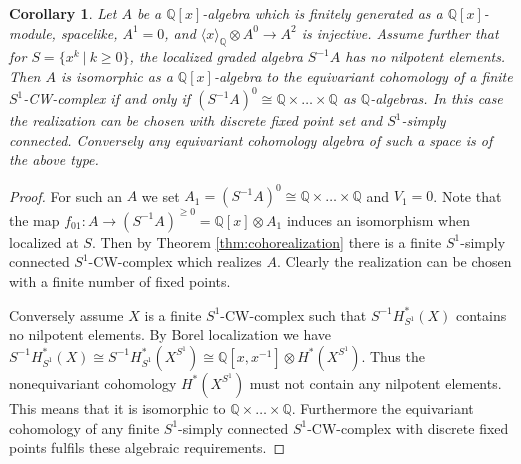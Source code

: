 \documentclass[12pt,a4paper]{article}
\newtheorem{cor}[thm]{Corollary}
\theoremstyle{definition}
\begin{document}
\begin{cor}\label{cor:discretealgebras}
Let $A$ be a $\mathbb{Q}[x]$-algebra which is finitely generated as a $\mathbb{Q}[x]$-module, spacelike, $A^1=0$, and $\langle x\rangle_\mathbb{Q}\otimes A^0\rightarrow A^2$ is injective. Assume further that for $S=\{x^k~|~k\geq 0\}$, the localized graded algebra $S^{-1}A$ has no nilpotent elements. Then $A$ is isomorphic as a $\mathbb{Q}[x]$-algebra to the equivariant cohomology of a finite $S^1$-CW-complex if and only if $(S^{-1}A)^0\cong \mathbb{Q}\times\ldots\times \mathbb{Q}$ as $\mathbb{Q}$-algebras. In this case the realization can be chosen with discrete fixed point set and $S^1$-simply connected. Conversely any equivariant cohomology algebra of such a space is of the above type.
\end{cor}

\begin{proof}
For such an $A$ we set $A_1=(S^{-1}A)^0\cong\mathbb{Q}\times\ldots\times \mathbb{Q}$ and $V_1=0$. Note that the map $f_{01}\colon A\rightarrow (S^{-1} A)^{\geq 0}=\mathbb{Q}[x]\otimes A_1$ induces an isomorphism when localized at $S$. Then by Theorem \ref{thm:cohorealization} there is a finite $S^1$-simply connected $S^1$-CW-complex which realizes $A$. Clearly the realization can be chosen with a finite number of fixed points.

Conversely assume $X$ is a finite $S^1$-CW-complex such that $S^{-1}H_{S^1}^*(X)$ contains no nilpotent elements. By Borel localization we have $S^{-1}H_{S^1}^*(X)\cong S^{-1}H_{S^1}^*(X^{S^1})\cong \mathbb{Q}[x,x^{-1}]\otimes H^*(X^{S^1})$. Thus the nonequivariant cohomology $H^*(X^{S^1})$ must not contain any nilpotent elements. This means that it is isomorphic to $\mathbb{Q}\times\ldots\times\mathbb{Q}$. Furthermore the equivariant cohomology of any finite $S^1$-simply connected $S^1$-CW-complex with discrete fixed points fulfils these algebraic requirements.
\end{proof}
\end{document}

